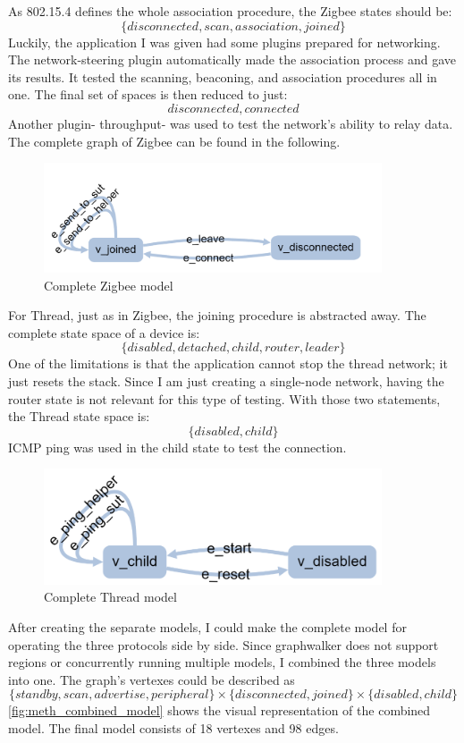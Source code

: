 As 802.15.4 defines the whole association procedure, the Zigbee states should be: \[
    \{disconnected, scan, association, joined\}
\] Luckily, the application I was given had some plugins prepared for networking. The network-steering plugin automatically made the association process and gave its results. It tested the scanning, beaconing, and association procedures all in one. The final set of spaces is then reduced to just: \[
    {disconnected, connected}
\] Another plugin- throughput- was used to test the network's ability to relay data. The complete graph of Zigbee can be found in the following.

\begin{figure}
    \includegraphics[width=100mm, keepaspectratio]{figures/model_zigbee_final.png}
    \caption{Complete Zigbee model}
\end{figure}

For Thread, just as in Zigbee, the joining procedure is abstracted away.
The complete state space of a device is: \[
    \{disabled, detached, child, router, leader\}
\] One of the limitations is that the application cannot stop the thread network; it just resets the stack. Since I am just creating a single-node network, having the router state is not relevant for this type of testing. With those two statements, the Thread state space is: \[
    \{disabled, child\}
\] ICMP ping was used in the child state to test the connection.

\begin{figure}
    \includegraphics[width=100mm, keepaspectratio]{figures/model_thread_finished.png}
    \caption{Complete Thread model}
\end{figure}

After creating the separate models, I could make the complete model for operating the three protocols side by side. Since graphwalker does not support regions or concurrently running multiple models, I combined the three models into one. The graph's vertexes could be described as \[
    \{standby, scan, advertise, peripheral\} \times  \{disconnected, joined\} \times \{disabled, child\}
\]
\autoref{fig:meth_combined_model} shows the visual representation of the combined model. The final model consists of 18 vertexes and 98 edges.

